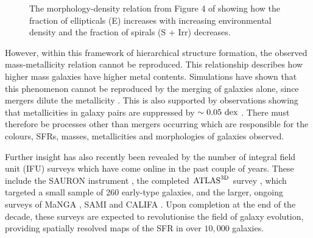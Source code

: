 \begin{figure}[t]
\caption[Morphology Density relation from Figure 4 of \cite{dressler80}]{The morphology-density relation from Figure 4 of \cite{dressler80} showing how the fraction of ellipticals (E) increases with increasing environmental density and the fraction of spirals (S + Irr) decreases.}
\label{fig:dressler}
\end{figure}

However, within this framework of hierarchical structure formation, the observed mass-metallicity relation \citep{tremonti04} cannot be reproduced. This relationship describes how higher mass galaxies have higher metal contents. Simulations have shown that this phenomenon cannot be reproduced by the merging of galaxies alone, since mergers dilute the metallicity \citep{pipino08,rupke10, montuori10, torrey12}. This is also supported by observations showing that metallicities in galaxy pairs are suppressed by $\sim0.05~\rm{dex}$ \citep{ellison08, michel08, scudder12}. There must therefore be processes other than mergers occurring which are responsible for the colours, SFRs, masses, metallicities and morphologies of galaxies observed. 

Further insight has also recently been revealed by the number of integral field unit (IFU) surveys which have come online in the past couple of years. These include the SAURON instrument \citep{bacon01}, the completed $\rm{ATLAS}^{\rm{3D}}$ survey \citep{cappellari11}, which targeted a small sample of 260 early-type galaxies, and the larger, ongoing surveys of MaNGA \citep{bundy15}, SAMI \citep{croom12} and CALIFA \citep{sanchez12}. Upon completion at the end of the decade, these surveys are expected to revolutionise the field of galaxy evolution, providing spatially resolved maps of the SFR in over $10,000$ galaxies.

